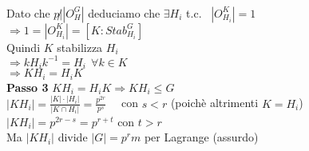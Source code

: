 \documentclass[12px]{article}
\begin{document}
{\begin{dimo}
\\
			 Dato che $p \not | |O_H^G|$ deduciamo che $\exists H_i$ t.c. \  $|O^K_{H_i}| = 1$\\
			 $  = |O^K_{H_i}|= [K:Stab_{H_i}^G]$ \\
			 Quindi $K$ stabilizza $H_i$\\
			 $ \Rightarrow kH_ik^{-1} = H_i \ \ \forall k\in K$\\
			 $ \Rightarrow KH_i = H_i K$ \\
			 \textbf{Passo 3}
			 $KH_i = H_i K \Rightarrow KH_i\leq G$ \\
			 $\displaystyle|KH_i| =  = $ \ \ con  $s<r$ (poichè altrimenti $K = H_i$)\\
			 $|KH_i| = p^{2r-s} = p^{r + t}$ con $t > r$\\
			 Ma  $|KH_i|$ divide $|G| = p^r m$ per Lagrange (assurdo)


\end{dimo}}
\end{document}
